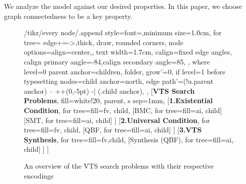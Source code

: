 \noindent %
We analyze the model against our desired properties.
%
%
In this paper, we choose graph connectedness to be a key property.
%
%

\begin {figure}[!t]
\centering
\begin{adjustbox}{width=0.9\columnwidth}
	{\Large
		
		\begin{forest}
			/tikz/every node/.append style={font=\sffamily,minimum size=1.0cm},
			for tree={
				edge+={->,thick},%
				draw,
				rounded corners,
				node options={align=center,},
				text width=1.7cm,
				calign=fixed edge angles, calign primary angle=-84,calign secondary angle=85,
			},
			where level=0{%
				parent anchor=children,
			}{%
				folder,
				grow'=0,
				if level=1{%
					before typesetting nodes={child anchor=north},
					edge path'={(!u.parent anchor) -- ++(0,-5pt) -| (.child anchor)},
				}{},
			}
			[\textbf{VTS Search \\ Problems}, fill=white!20, parent, s sep=1mm,
			[\textbf{1.Existential Condition}, for tree={fill=fv, child}, 
			[BMC, for tree={fill=ai, child}]
			[SMT, for tree={fill=ai, child}]
			]
			[\textbf{2.Universal Condition}, for tree={fill=fv, child},
			[QBF, for tree={fill=ai, child}]
			]
			[\textbf{3.VTS Synthesis}, for tree={fill=fv,child}, 
			[Synthesis (QBF), for tree={fill=ai, child}]
			]
			]
		\end{forest}
	}
\end{adjustbox}
\vspace{0.01cm}


\caption{An overview of the VTS search problems with their respective encodings}
\label{fig:vts-search}
\end{figure}

